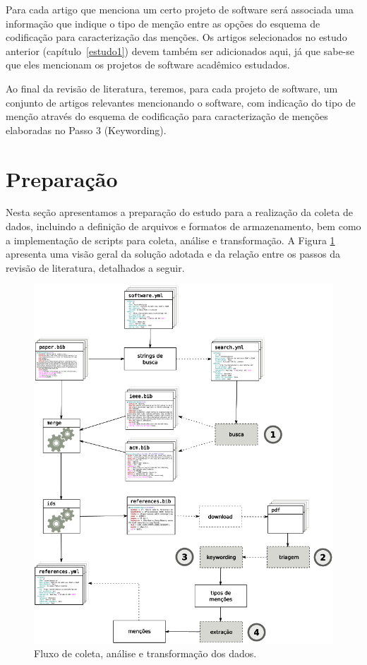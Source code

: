 Para cada artigo que menciona um certo projeto de software será associada uma
informação que indique o tipo de menção entre as opções do esquema de
codificação para caracterização das menções. Os artigos selecionados no estudo
anterior (capítulo~\ref{estudo1}) devem também ser adicionados aqui, já que
sabe-se que eles mencionam os projetos de software acadêmico estudados.

Ao final da revisão de literatura, teremos, para cada projeto de software, um
conjunto de artigos relevantes mencionando o software, com indicação do tipo de menção
através do esquema de codificação para caracterização de menções elaboradas no Passo 3 (Keywording).


\section{Preparação} \label{estudo2:preparacao} %

Nesta seção apresentamos a preparação do estudo para a realização da coleta de
dados, incluindo a definição de arquivos e formatos de armazenamento, bem como
a implementação de scripts para coleta, análise e transformação.
A Figura \ref{estudo2-fluxograma} apresenta uma visão geral da solução adotada
e da relação entre os passos da revisão de literatura, detalhados a seguir.

\begin{figure}[h]
  \center
  \includegraphics[scale=0.35]{imagens/estudo2-fluxograma.png}
  \caption{Fluxo de coleta, análise e transformação dos dados.}
  \label{estudo2-fluxograma}
\end{figure}

